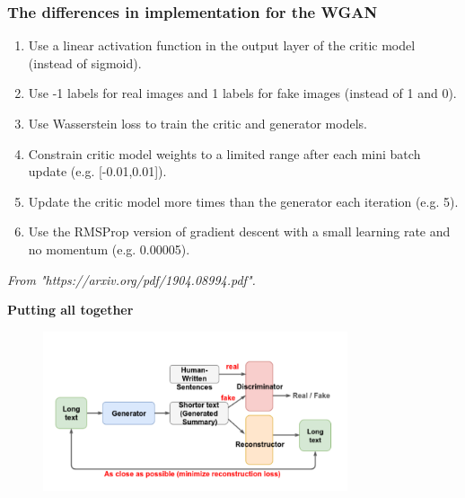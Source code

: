 \documentclass{tum-presentation}
\begin{document}
\begin{frame}
	\frametitle{The differences in implementation for the WGAN}
	\begin{enumerate}
		\item Use a linear activation function in the output layer of the critic model (instead of sigmoid).
		\item Use -1 labels for real images and 1 labels for fake images (instead of 1 and 0).
		\item Use Wasserstein loss to train the critic and generator models.
		\item Constrain critic model weights to a limited range after each mini batch update (e.g. [-0.01,0.01]).
		\item Update the critic model more times than the generator each iteration (e.g. 5).
		\item Use the RMSProp version of gradient descent with a small learning rate and no momentum (e.g. 0.00005).	
	\end{enumerate}
	\begin{flushright}
		\textit{From "https://arxiv.org/pdf/1904.08994.pdf".}
	\end{flushright}
\end{frame}

\begin{frame}[c]
	\centering
	\begin{center}
		\Huge\textbf{Putting all together}
	\end{center}
\end{frame}

\begin{frame}
	\begin{figure}
		\centering
		\includegraphics[width=0.8\textwidth,keepaspectratio=true]{tum-resources/images/paper_2.png}
		\label{fig:paper_2}
	\end{figure}
\end{frame}
\end{document}
